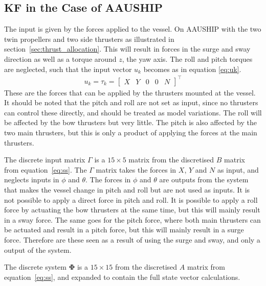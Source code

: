 \subsection{\acl{KF} in the Case of AAUSHIP}
\label{sec:kfonaauship}
The input is given by the forces applied to the vessel. On AAUSHIP with the two twin propellers and two side thrusters as illustrated in section~\vref{sec:thrust_allocation}. This will result in forces in the surge and sway direction as well as a torque around $z$, the yaw axis. The roll and pitch torques are neglected, such that the input vector $u_k$ becomes as in equation \ref{eq:uk}.
\begin{align}
u_k = \tau_k =
\begin{bmatrix}
X & Y & 0 & 0 & N
\end{bmatrix}^\top
\label{eq:uk}
\end{align}
These are the forces that can be applied by the thrusters mounted at the vessel. It should be noted that the pitch and roll are not set as input, since no thrusters can control these directly, and should be treated as model variations. The roll will be affected by the bow thrusters but very little. The pitch is also affected by the two main thrusters, but this is only a product of applying the forces at the main thrusters.

The discrete input matrix $\Gamma$ is a $15 \times 5$ matrix from the discretised $B$ matrix from equation~\vref{eq:ss}.
The $\Gamma$ matrix takes the forces in $X$, $Y$ and $N$ as input, and neglects inputs in $\phi$ and $\theta$. The forces in $\phi$ and $\theta$ are outputs from the system that makes the vessel change in pitch and roll but are not used as inputs. It is not possible to apply a direct force in pitch and roll. It is possible to apply a roll force by actuating the bow thrusters at the same time, but this will mainly result in a sway force. The same goes for the pitch force, where both main thrusters can be actuated and result in a pitch force, but this will mainly result in a surge force. Therefore are these seen as a result of using the surge and sway, and only a output of the system.

The discrete system $\boldsymbol \Phi$ is a $15 \times 15$ from the discretised $A$ matrix from equation~\vref{eq:ss}, and expanded to contain the full state vector calculations.

